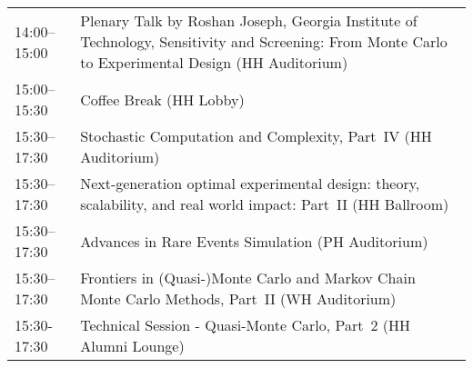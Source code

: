 \begin{table}
{\begin{tabularx}{\textwidth}{>{\hsize=0.32\hsize}X|>{\hsize=1.7\hsize}X}
\cellcolor{\PlenaryColor}14:00–15:00 & \cellcolor{\PlenaryColor}Plenary Talk by Roshan Joseph, Georgia Institute of Technology, Sensitivity and Screening: From Monte Carlo to Experimental Design (HH Auditorium) \\
\cellcolor{\EmptyColor}15:00–15:30 & \cellcolor{\EmptyColor}Coffee Break (HH Lobby) \\
\cellcolor{\SessionTitleColor}15:30–17:30 & \cellcolor{\SessionTitleColor}Stochastic Computation and Complexity, Part~IV (HH Auditorium) \\
\cellcolor{\SessionTitleColor}15:30–17:30 & \cellcolor{\SessionTitleColor}Next-generation optimal experimental design: theory, scalability, and real world impact: Part~II (HH Ballroom) \\
\cellcolor{\SessionTitleColor}15:30–17:30 & \cellcolor{\SessionTitleColor}Advances in Rare Events Simulation (PH Auditorium) \\
\cellcolor{\SessionTitleColor}15:30–17:30 & \cellcolor{\SessionTitleColor}Frontiers in (Quasi-)Monte Carlo and Markov Chain Monte Carlo Methods, Part~II (WH Auditorium) \\
\cellcolor{\SessionLightColor}15:30-17:30 & \cellcolor{\SessionLightColor}Technical Session - Quasi-Monte Carlo, Part~2 (HH Alumni Lounge) \\
\hline
\end{tabularx}
}
\end{table}

